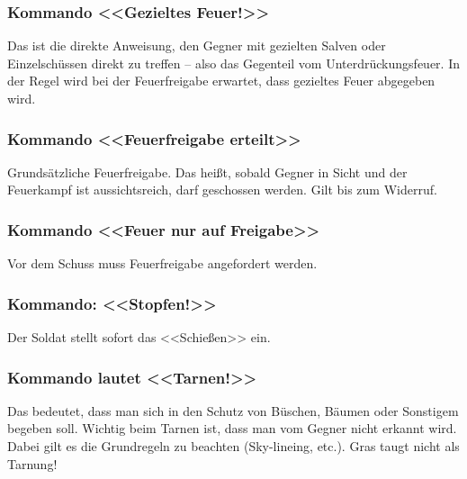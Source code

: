 \subsubsection{Kommando <<Gezieltes Feuer!>>}
Das ist die direkte Anweisung, den Gegner mit gezielten Salven oder Einzelschüssen direkt zu treffen – also das Gegenteil vom Unterdrückungsfeuer. In der Regel wird bei der Feuerfreigabe erwartet, dass gezieltes Feuer abgegeben wird. \\
\subsubsection{Kommando <<Feuerfreigabe erteilt>>}
Grundsätzliche Feuerfreigabe. Das heißt, sobald Gegner in Sicht und der Feuerkampf ist aussichtsreich, darf geschossen werden. Gilt bis zum Widerruf. \\
\subsubsection{Kommando <<Feuer nur auf Freigabe>>}
Vor dem Schuss muss Feuerfreigabe angefordert werden. \\
\subsubsection{Kommando: <<Stopfen!>>}
Der Soldat stellt sofort das <<Schießen>> ein. \\
\subsubsection{Kommando lautet <<Tarnen!>>}
Das bedeutet, dass man sich in den Schutz von Büschen, Bäumen oder Sonstigem begeben soll. Wichtig beim Tarnen ist, dass man vom Gegner nicht erkannt wird. Dabei gilt es die Grundregeln zu beachten (Sky-lineing, etc.). Gras taugt nicht als Tarnung! \\
